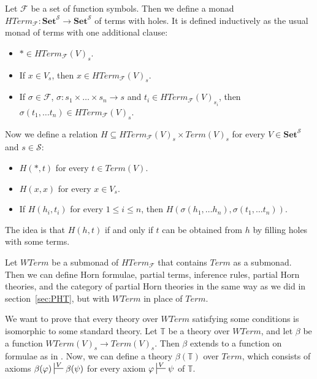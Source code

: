 \documentclass{elsarticle}
\theoremstyle{definition}
\theoremstyle{remark}
\newcommand{\cat}[1]{\mathbf{#1}}
\newcommand{\Set}{\cat{Set}}
\numberwithin{figure}{section}
\begin{document}
Let $\mathcal{F}$ be a set of function symbols.
Then we define a monad $HTerm_\mathcal{F} : \Set^\mathcal{S} \to \Set^\mathcal{S}$ of terms with holes.
It is defined inductively as the usual monad of terms with one additional clause:
\begin{itemize}
\item $* \in HTerm_\mathcal{F}(V)_s$.
\item If $x \in V_s$, then $x \in HTerm_\mathcal{F}(V)_s$.
\item If $\sigma \in \mathcal{F}$, $\sigma : s_1 \times \ldots \times s_n \to s$ and $t_i \in HTerm_\mathcal{F}(V)_{s_i}$, then $\sigma(t_1, \ldots t_n) \in HTerm_\mathcal{F}(V)_s$.
\end{itemize}

Now we define a relation $H \subseteq HTerm_\mathcal{F}(V)_s \times Term(V)_s$ for every $V \in \Set^\mathcal{S}$ and $s \in \mathcal{S}$:
\begin{itemize}
\item $H(*,t)$ for every $t \in Term(V)$.
\item $H(x,x)$ for every $x \in V_s$.
\item If $H(h_i,t_i)$ for every $1 \leq i \leq n$, then $H(\sigma(h_1, \ldots h_n), \sigma(t_1, \ldots t_n))$.
\end{itemize}
The idea is that $H(h,t)$ if and only if $t$ can be obtained from $h$ by filling holes with some terms.

Let $WTerm$ be a submonad of $HTerm_\mathcal{F}$ that contains $Term$ as a submonad.
Then we can define Horn formulae, partial terms, inference rules, partial Horn theories, and the category of partial Horn theories
    in the same way as we did in section~\ref{sec:PHT}, but with $WTerm$ in place of $Term$.

We want to prove that every theory over $WTerm$ satisfying some conditions is isomorphic to some standard theory.
Let $\mathbb{T}$ be a theory over $WTerm$, and let $\beta$ be a function $WTerm(V)_s \to Term(V)_s$.
Then $\beta$ extends to a function on formulae as in .
Now, we can define a theory $\beta(\mathbb{T})$ over $Term$, which consists of axioms
    $\beta(\varphi) \sststile{}{V} \beta(\psi)$ for every axiom $\varphi \sststile{}{V} \psi$ of $\mathbb{T}$.
\end{document}
